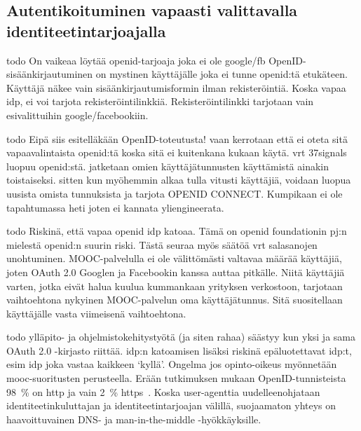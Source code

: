 \documentclass[finnish,gradu]{tktltiki}
\begin{document}
  \subsection{Autentikoituminen vapaasti valittavalla identiteetintarjoajalla} %
  \label{sub:autentikoituminen_käyttäjäkeskeisellä_identiteetillä}

  todo
  On vaikeaa löytää openid-tarjoaja joka ei ole google/fb
  OpenID-sisäänkirjautuminen on mystinen käyttäjälle joka ei tunne openid:tä etukäteen. Käyttäjä näkee vain sisäänkirjautumisformin ilman rekisteröintiä. Koska vapaa idp, ei voi tarjota rekisteröintilinkkiä. Rekisteröintilinkki tarjotaan vain esivalittuihin google/facebookiin.

  todo
  Eipä siis esitelläkään OpenID-toteutusta! vaan kerrotaan että ei oteta sitä vapaavalintaista openid:tä koska sitä ei kuitenkana kukaan käytä. vrt 37signals luopuu openid:stä. jatketaan omien käyttäjätunnusten käyttämistä ainakin toistaiseksi. sitten kun myöhemmin alkaa tulla vitusti käyttäjiä, voidaan luopua uusista omista tunnuksista ja tarjota OPENID CONNECT. Kumpikaan ei ole tapahtumassa heti joten ei kannata yliengineerata.

  todo
  Riskinä, että vapaa openid idp katoaa. Tämä on openid foundationin pj:n mielestä openid:n suurin riski. Tästä seuraa myös säätöä vrt salasanojen unohtuminen. MOOC-palvelulla ei ole välittömästi valtavaa määrää käyttäjiä, joten OAuth 2.0 Googlen ja Facebookin kanssa auttaa pitkälle. Niitä käyttäjiä varten, jotka eivät halua kuulua kummankaan yrityksen verkostoon, tarjotaan vaihtoehtona nykyinen MOOC-palvelun oma käyttäjätunnus. Sitä suositellaan käyttäjälle vasta viimeisenä vaihtoehtona.

  todo
  ylläpito- ja ohjelmistokehitystyötä (ja siten rahaa) säästyy kun yksi ja sama OAuth 2.0 -kirjasto riittää. idp:n katoamisen lisäksi riskinä epäluotettavat idp:t, esim idp joka vastaa kaikkeen `kyllä'. Ongelma jos opinto-oikeus myönnetään mooc-suoritusten perusteella.
  Erään tutkimuksen mukaan OpenID-tunnisteista 98~\% on http ja vain 2~\% https~\cite{openid_identifier_survey_2011}.
  Koska user-agenttia uudelleenohjataan identiteetinkuluttajan ja identiteetintarjoajan välillä, suojaamaton yhteys on haavoittuvainen DNS- ja man-in-the-middle -hyökkäyksille.



\end{document}

